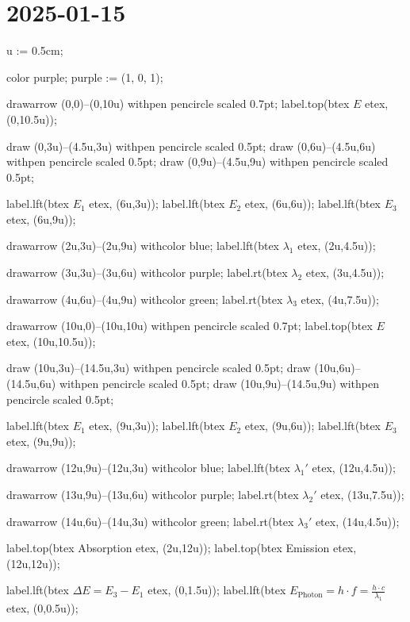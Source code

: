 \section{2025-01-15}

\startMPpage
u := 0.5cm;

color purple;
purple := (1, 0, 1); %

drawarrow (0,0)--(0,10u) withpen pencircle scaled 0.7pt;
label.top(btex $E$ etex, (0,10.5u));

draw (0,3u)--(4.5u,3u) withpen pencircle scaled 0.5pt;
draw (0,6u)--(4.5u,6u) withpen pencircle scaled 0.5pt;
draw (0,9u)--(4.5u,9u) withpen pencircle scaled 0.5pt;

label.lft(btex $E_1$ etex, (6u,3u));
label.lft(btex $E_2$ etex, (6u,6u));
label.lft(btex $E_3$ etex, (6u,9u));

drawarrow (2u,3u)--(2u,9u) withcolor blue;
label.lft(btex $\lambda_1$ etex, (2u,4.5u));

drawarrow (3u,3u)--(3u,6u) withcolor purple;
label.rt(btex $\lambda_2$ etex, (3u,4.5u));

drawarrow (4u,6u)--(4u,9u) withcolor green;
label.rt(btex $\lambda_3$ etex, (4u,7.5u));

drawarrow (10u,0)--(10u,10u) withpen pencircle scaled 0.7pt;
label.top(btex $E$ etex, (10u,10.5u));

draw (10u,3u)--(14.5u,3u) withpen pencircle scaled 0.5pt;
draw (10u,6u)--(14.5u,6u) withpen pencircle scaled 0.5pt;
draw (10u,9u)--(14.5u,9u) withpen pencircle scaled 0.5pt;

label.lft(btex $E_1$ etex, (9u,3u));
label.lft(btex $E_2$ etex, (9u,6u));
label.lft(btex $E_3$ etex, (9u,9u));

drawarrow (12u,9u)--(12u,3u) withcolor blue;
label.lft(btex $\lambda_1'$ etex, (12u,4.5u));

drawarrow (13u,9u)--(13u,6u) withcolor purple;
label.rt(btex $\lambda_2'$ etex, (13u,7.5u));

drawarrow (14u,6u)--(14u,3u) withcolor green;
label.rt(btex $\lambda_3'$ etex, (14u,4.5u));

label.top(btex Absorption etex, (2u,12u));
label.top(btex Emission etex, (12u,12u));

label.lft(btex $\Delta E = E_3 - E_1$ etex, (0,1.5u));
label.lft(btex $E_{\text{Photon}} = h \cdot f = \frac{h \cdot c}{\lambda_1}$ etex, (0,0.5u));

